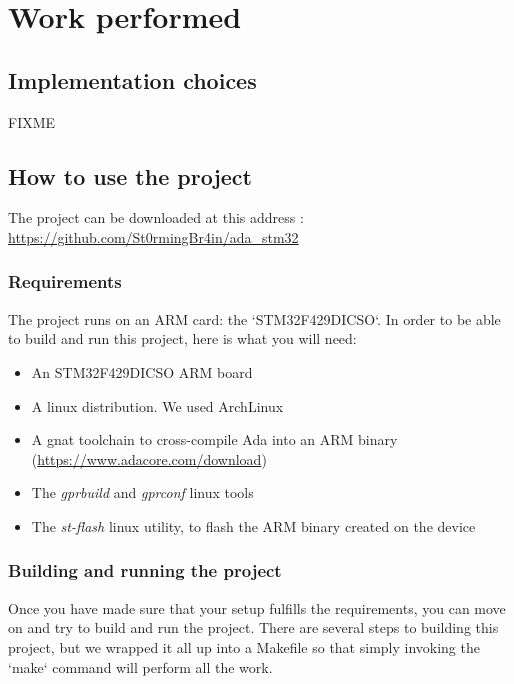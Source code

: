\section{Work performed}

\subsection{Implementation choices}

FIXME

\subsection{How to use the project}

\begin{noindent}
The project can be downloaded at this address : \\
\url{https://github.com/St0rmingBr4in/ada_stm32}
\end{noindent}

\subsubsection{Requirements}

The project runs on an ARM card: the `STM32F429DICSO`. In order to be able to
build and run this project, here is what you will need:

\begin{itemize}
	\item An STM32F429DICSO ARM board
	\item A linux distribution. We used ArchLinux
    \item A gnat toolchain to cross-compile Ada into an ARM binary
		(\url{https://www.adacore.com/download})
	\item The \textit{gprbuild} and \textit{gprconf} linux tools
	\item The \textit{st-flash} linux utility, to flash the ARM binary created on the
		  device
\end{itemize}

\subsubsection{Building and running the project}

Once you have made sure that your setup fulfills the requirements, you can
move on and try to build and run the project. There are several steps to
building this project, but we wrapped it all up into a Makefile so that simply
invoking the `make` command will perform all the work.

